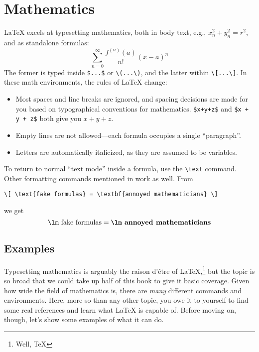 \chapter{Mathematics}
\label{math}

\LaTeX{} excels at typesetting mathematics, both in body text,
e.g., $x_n^2+y_n^2=r^2$, and as standalone formulas:
\[\sum_{n=0}^{\infty} \frac{f^{(n)} (a)}{n!} (x - a)^n\]
The former is typed inside \verb|$...$| or \verb|\(...\)|,
and the latter within \verb|\[...\]|.
In these math environments, the rules of \LaTeX{} change:
\begin{itemize}
\item Most spaces and line breaks are ignored,
    and spacing decisions are made for you based on
    typographical conventions for mathematics.
    \verb|$x+y+z$| and \verb|$x + y + z$| both give you $x+y+z$.
\item Empty lines are not allowed---each formula occupies a single
    ``paragraph''\quotekern.
\item Letters are automatically italicized, as they are assumed to be variables.
\end{itemize}
To return to normal ``text mode'' inside a formula, use the \verb|\text| command.
Other formatting commands mentioned in  work as well.
From
\begin{leftfigure}
\begin{lstlisting}
\[ \text{fake formulas} = \textbf{annoyed mathematicians} \]
\end{lstlisting}
\end{leftfigure}
we get
\[ \text{\lm fake formulas} = \textbf{\lm annoyed mathematicians} \]

\section{Examples}

Typesetting mathematics is arguably the raison d'être of
\LaTeX,\punckern\footnote{Well, \TeX} but the topic is so broad that we could
take up half of this book to give it basic coverage.
Given how wide the field of mathematics is,
there are \emph{many} different commands and environments.
Here, more so than any other topic,
you owe it to yourself to find some real references and learn what \LaTeX{}
is capable of.
Before moving on, though, let's show some examples of what it can do.
\newpage

